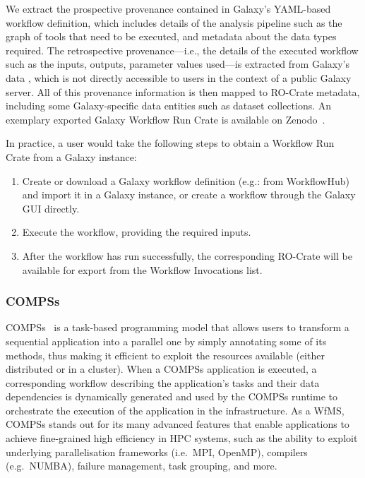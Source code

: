We extract the prospective provenance contained in Galaxy's \acrshort{YAML}-based 
 workflow definition, which includes details of the analysis pipeline such as the graph of tools that need to be executed, and metadata about the data types required.
The retrospective provenance---i.e., the details of the executed workflow such as the inputs, outputs, parameter values used---is extracted from Galaxy's data , which is not directly accessible to users in the context of a public Galaxy server.
All of this provenance information is then mapped to RO-Crate metadata, including some Galaxy-specific data entities such as dataset collections.
An exemplary exported Galaxy Workflow Run Crate is available on Zenodo~\cite{De Geest 2023b}.

In practice, a user would take the following steps to obtain a Workflow Run Crate from a Galaxy instance: 

\begin{enumerate}[(1)]
  \item Create or download a Galaxy workflow definition (e.g.: from WorkflowHub) and import it in a Galaxy instance, or create a workflow through the Galaxy GUI directly.
  \item Execute the workflow, providing the required inputs.
  \item After the workflow has run successfully, the corresponding RO-Crate will be available for export from the Workflow Invocations list.
\end{enumerate}


\subsubsection{COMPSs}\label{ch54:compss}

COMPSs~\cite{Lordan 2014} is a task-based programming model that allows users to transform a sequential application into a parallel one by simply annotating some of its methods, thus making it efficient to exploit the resources available (either distributed or in a cluster).
When a COMPSs application is executed, a corresponding workflow describing the application's tasks and their data dependencies is dynamically generated and used by the COMPSs runtime to orchestrate the execution of the application in the infrastructure.
As a WfMS, COMPSs stands out for its many advanced features that enable applications to achieve fine-grained high efficiency in HPC systems, such as the ability to exploit underlying parallelisation frameworks (i.e.~MPI, OpenMP), compilers (e.g.~NUMBA), failure management, task grouping, and more.

